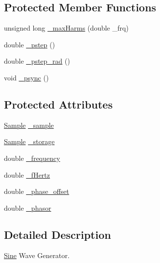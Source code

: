 \subsection*{Protected Member Functions}
\begin{DoxyCompactItemize}
\item 
unsigned long \hyperlink{classSignal_1_1Fourier_1_1FourierGenerator_a99720416bd9ff96636f4acf956a785d5}{\+\_\+max\+Harms} (double \+\_\+frq)
\item 
double \hyperlink{classSignal_1_1SignalGenerator_a43b0eec84ee7df04c947533c0511c2c0}{\+\_\+pstep} ()
\item 
double \hyperlink{classSignal_1_1SignalGenerator_abf2f4ab977c6e84bf85022eab8135304}{\+\_\+pstep\+\_\+rad} ()
\item 
void \hyperlink{classSignal_1_1SignalGenerator_a563f57d4dfd8728a6a572f15c1e2532b}{\+\_\+psync} ()
\end{DoxyCompactItemize}
\subsection*{Protected Attributes}
\begin{DoxyCompactItemize}
\item 
\hyperlink{classSignal_1_1Sample}{Sample} \hyperlink{classSignal_1_1Fourier_1_1FourierGenerator_ad720bf2b268dc621ace64c54c0816597}{\+\_\+sample}
\item 
\hyperlink{classSignal_1_1Sample}{Sample} \hyperlink{classSignal_1_1Fourier_1_1FourierGenerator_ab6e6b79cf56e31c9a1b5766f357f8cfb}{\+\_\+storage}
\item 
double \hyperlink{classSignal_1_1SignalGenerator_a7f107461333bce68c5dad412db96a8c2}{\+\_\+frequency}
\item 
double \hyperlink{classSignal_1_1SignalGenerator_a85a4702347352bab1c71e0a8df8437d6}{\+\_\+f\+Hertz}
\item 
double \hyperlink{classSignal_1_1SignalGenerator_a6b4444d46747c8517171edbbf4b5588f}{\+\_\+phase\+\_\+offset}
\item 
double \hyperlink{classSignal_1_1SignalGenerator_af4aa0728ded00777be26a06d883eaeb3}{\+\_\+phasor}
\end{DoxyCompactItemize}


\subsection{Detailed Description}
\hyperlink{classSignal_1_1Fourier_1_1Sine}{Sine} Wave Generator. 

